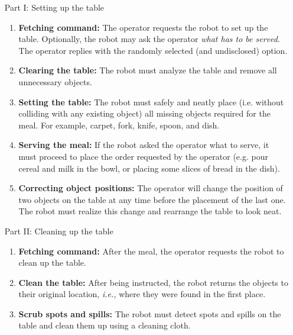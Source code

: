 \begin{itemize}
	\item[Part I:] Setting up the table
	\begin{enumerate}
		\item \textbf{Fetching command:} The operator requests the robot to set up the table. Optionally, the robot may ask the operator \textit{what has to be served}. The operator replies with the randomly selected (and undisclosed) option.

		\item \textbf{Clearing the table:} The robot must analyze the table and remove all unnecessary objects.

		\item \textbf{Setting the table:} The robot must safely and neatly place (i.e. without colliding with any existing object) all missing objects required for the meal. For example, carpet, fork, knife, spoon, and dish.

		\item \textbf{Serving the meal:} If the robot asked the operator what to serve, it must proceed to place the order requested by the operator (e.g. pour cereal and milk in the bowl, or placing some slices of bread in the dish).

		\item \textbf{Correcting object positions:} The operator will change the position of two objects on the table at any time before the placement of the last one. The robot must realize this change and rearrange the table to look neat.
	\end{enumerate}

	\item[Part II:] Cleaning up the table
	\begin{enumerate}
		\item \textbf{Fetching command:} After the meal, the operator requests the robot to clean up the table.

		\item \textbf{Clean the table:} After being instructed, the robot returns the objects to their original location, \textit{i.e.,} where they were found in the first place.

		\item \textbf{Scrub spots and spills:} The robot must detect spots and spills on the table and clean them up using a cleaning cloth.
	\end{enumerate}
\end{itemize}

